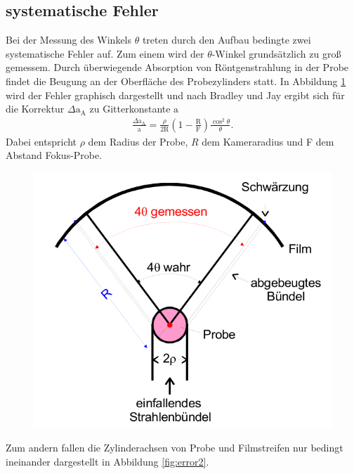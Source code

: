 \subsection{systematische Fehler}
Bei der Messung des Winkels $\theta$
treten durch den Aufbau bedingte zwei systematische Fehler auf.
Zum einem wird der $\theta$-Winkel grundsätzlich zu groß gemessem.
Durch überwiegende Absorption von Röntgenstrahlung in der Probe
findet die Beugung an der Oberfläche des
Probezylinders statt. In Abbildung \ref{fig:error1} wird
der Fehler graphisch dargestellt und nach Bradley und Jay
ergibt sich für die Korrektur
$\Delta \mathrm{a}_\mathrm{A}$
zu Gitterkonstante $\mathrm{a}$
\begin{align}
  \frac{\Delta \mathrm{a}_\mathrm{A}}{\mathrm{a}}=\frac{\rho}{2\mathrm{R}}\left(1-\frac{\mathrm{R}}{\mathrm{F}}\right)\frac{\cos^2\theta}{\theta}. \label{eqn:sys1}
\end{align}
Dabei entspricht $\rho$ dem Radius der Probe, $R$ dem Kameraradius
und F dem Abstand Fokus-Probe.

 \begin{figure}
   \centering
   \includegraphics{Syst_error_1.PNG}
   \caption{  }
   \label{fig:error1}
  \end{figure}

Zum andern fallen die Zylinderachsen von Probe und Filmstreifen
nur bedingt ineinander dargestellt in Abbildung \ref{fig:error2}.

